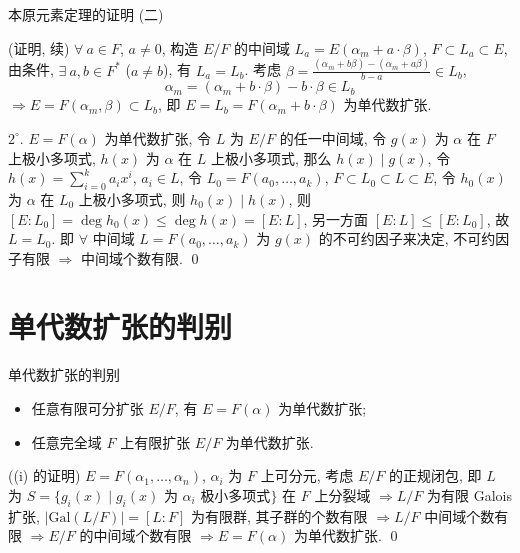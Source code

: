 \begin{frame}{本原元素定理的证明 (二)}

\startproof[bg=yellow, fg=red](证明, 续)
$\forall\ a \in F$, $a \neq 0$, 构造 $E/F$ 的中间域
$L_a = E(\alpha_m + a \cdot \beta)$,
$F \subset L_a \subset E$, 由条件, $\exists\ a, b \in F^{*}$ ($a \neq b$),
有 $L_a = L_b$.
考虑 $\beta = \frac{(\alpha_m + b\beta) - (\alpha_m + a\beta)}{b - a} \in L_b$,
\[
\alpha_m = (\alpha_m + b \cdot \beta) - b \cdot \beta \in L_b
\]
$\Longrightarrow E = F(\alpha_m, \beta) \subset L_b$, 即
$E = L_b = F(\alpha_m + b \cdot \beta)$ 为单代数扩张.

\pause

$2^{\circ}$. $E = F(\alpha)$ 为单代数扩张, 令 $L$ 为 $E/F$ 的任一中间域,
令 $g(x)$ 为 $\alpha$ 在 $F$ 上极小多项式, $h(x)$ 为 $\alpha$ 在 $L$ 上极小多项式,
那么 $h(x) \mid g(x)$, 令 $h(x) = \sum_{i=0}^{k} a_i x^i$, $a_i \in L$,
令 $L_0 = F(a_0, \dots, a_k)$, $F \subset L_0 \subset L \subset E$,
令 $h_0(x)$ 为 $\alpha$ 在 $L_0$ 上极小多项式, 则 $h_0(x) \mid h(x)$,
则 $[E:L_0] = \deg h_0(x) \leq \deg h(x) = [E:L]$,
另一方面 $[E:L] \leq [E:L_0]$, 故 $L = L_0$.
即 $\forall$ 中间域 $L = F(a_0, \dots, a_k)$ 为 $g(x)$ 的不可约因子来决定,
不可约因子有限 $\Longrightarrow$ 中间域个数有限.
\qed

\end{frame}


\section[单扩张]{单代数扩张的判别}


\begin{frame}{单代数扩张的判别}

\begin{cor}[单代数扩张的判别]
\begin{itemize}
\item[(i)] 任意有限可分扩张 $E/F$, 有 $E = F(\alpha)$ 为单代数扩张;
\item[(ii)] 任意完全域 $F$ 上有限扩张 $E/F$ 为单代数扩张.
\end{itemize}
\end{cor}

\startproof[bg=yellow, fg=red]((i) 的证明)
$E = F(\alpha_1, \dots, \alpha_n)$, $\alpha_i$ 为 $F$ 上可分元,
考虑 $E/F$ 的正规闭包,
即 $L$ 为 $S = \{ g_i(x) \mid g_i(x) \text{ 为 } \alpha_i \text{ 极小多项式} \}$
在 $F$ 上分裂域
$\Longrightarrow L/F$ 为有限 Galois 扩张,
$|\mathrm{Gal}(L/F)| = [L:F]$ 为有限群,
其子群的个数有限 $\Longrightarrow L/F$ 中间域个数有限
$\Longrightarrow E/F$ 的中间域个数有限 $\Longrightarrow E = F(\alpha)$ 为单代数扩张.
\qed

\end{frame}

